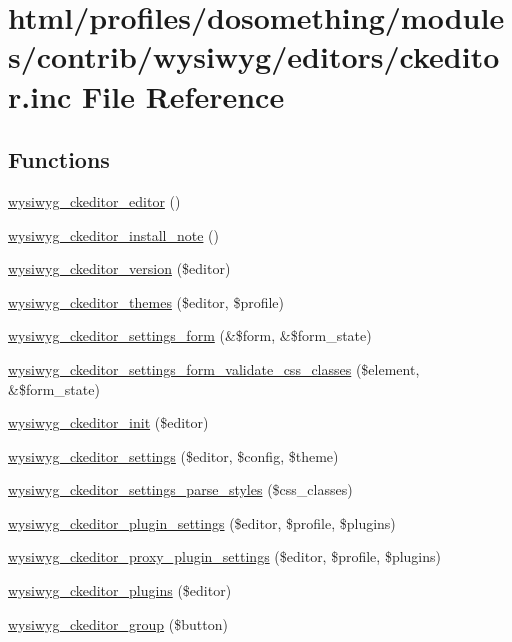 \hypertarget{ckeditor_8inc}{
\section{html/profiles/dosomething/modules/contrib/wysiwyg/editors/ckeditor.inc File Reference}
\label{ckeditor_8inc}
}
\subsection*{Functions}
\begin{DoxyCompactItemize}
\item 
\hyperlink{ckeditor_8inc_a0cb339543d3ff4f4b42081c467fb1afe}{wysiwyg\_\-ckeditor\_\-editor} ()
\item 
\hyperlink{ckeditor_8inc_a72a39d7442d839515d6280eb5f5adbe3}{wysiwyg\_\-ckeditor\_\-install\_\-note} ()
\item 
\hyperlink{ckeditor_8inc_a3b5d7fe336c32260d82eb539340a5fff}{wysiwyg\_\-ckeditor\_\-version} (\$editor)
\item 
\hyperlink{ckeditor_8inc_a69108b6a32bbebf8a2e5de05de76c039}{wysiwyg\_\-ckeditor\_\-themes} (\$editor, \$profile)
\item 
\hyperlink{ckeditor_8inc_a99ea1c868cbd240643f8f9299b73be3f}{wysiwyg\_\-ckeditor\_\-settings\_\-form} (\&\$form, \&\$form\_\-state)
\item 
\hyperlink{ckeditor_8inc_a8b614c7b72178d43bc7028fbd35be0e2}{wysiwyg\_\-ckeditor\_\-settings\_\-form\_\-validate\_\-css\_\-classes} (\$element, \&\$form\_\-state)
\item 
\hyperlink{ckeditor_8inc_af59c8327a34782dc05851481f5b28008}{wysiwyg\_\-ckeditor\_\-init} (\$editor)
\item 
\hyperlink{ckeditor_8inc_a43ec7d691d35f31180b2d401fa3bde6d}{wysiwyg\_\-ckeditor\_\-settings} (\$editor, \$config, \$theme)
\item 
\hyperlink{ckeditor_8inc_a333ec4086966407d90ad5ab846f44f94}{wysiwyg\_\-ckeditor\_\-settings\_\-parse\_\-styles} (\$css\_\-classes)
\item 
\hyperlink{ckeditor_8inc_a5b4c9ea46e84b684291c1eebfa0496c9}{wysiwyg\_\-ckeditor\_\-plugin\_\-settings} (\$editor, \$profile, \$plugins)
\item 
\hyperlink{ckeditor_8inc_a5445976f1dfa660b7287237151bca2ad}{wysiwyg\_\-ckeditor\_\-proxy\_\-plugin\_\-settings} (\$editor, \$profile, \$plugins)
\item 
\hyperlink{ckeditor_8inc_ab92e1bed993d878f7258749b02d074a1}{wysiwyg\_\-ckeditor\_\-plugins} (\$editor)
\item 
\hyperlink{ckeditor_8inc_a9fc28d9baa8e7c55221045b2b554eabf}{wysiwyg\_\-ckeditor\_\-group} (\$button)
\end{DoxyCompactItemize}


